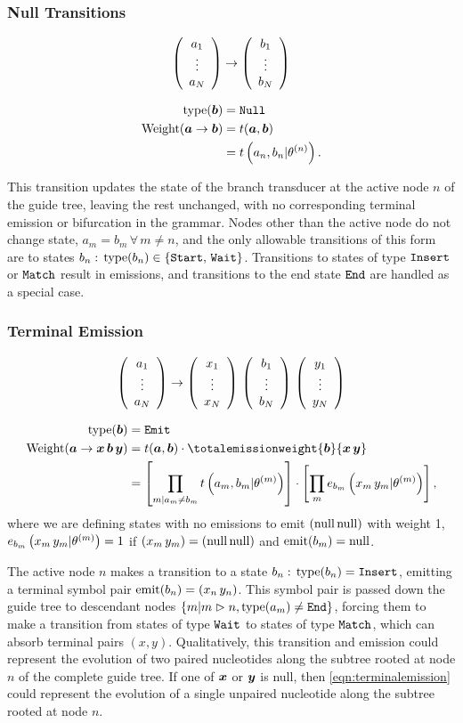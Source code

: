 \documentclass[10pt]{article}
\begin{document}
\subsubsection*{Null Transitions}

\[ \statevec{a} \to \statevec{b} \]

\begin{align} \label{eqn:nulltransition}
  \type(\bvec{b}) &= \Snull  \\
  \weight(\bvec{a}\to\bvec{b}) &= t(\bvec{a},\bvec{b}) \\
  &= \transweight{n}{a_n}{b_n} .
\end{align}

This transition updates the state of the branch transducer at the active node $n$ of the guide tree, leaving 
the rest unchanged, with no corresponding terminal emission or bifurcation in the grammar.
Nodes other than the active node do not change state, $a_m = b_m \,\forall\, m \ne n$, and the only 
allowable transitions of this form are to states $b_n:\,\type(b_n) \in \{\Sstart,\,\Swait\}$.  Transitions
to states of type $\Sinsert$ or $\Smatch$ result in emissions, and transitions to the end state $\Send$
are handled as a special case.


\subsubsection*{Terminal Emission} 
\[ \statevec{a} \to \statevec{x}\,\statevec{b}\,\statevec{y} \]

\begin{align} \label{eqn:terminalemission}
  \type(\bvec{b}) &= \Semit \\
  \weight(\bvec{a}\to\bvec{x}\,\bvec{b}\,\bvec{y}) &=  t(\bvec{a},\bvec{b}) \cdot \totalemissionweight{\bvec{b}}{\bvec{x}\,\bvec{y}} \\
  &= \left[ \prod_{m|a_m \ne b_m} \transweight{m}{a_m}{b_m} \right] \cdot \left[ \prod_m \emissionweight{m}{b_m}{x_m\,y_m} \right] ,
\end{align}
where we are defining states with no emissions to emit $(\Tnull\,\Tnull)$ with weight 1, 
$\emissionweight{m}{b_m}{x_m\,y_m} = 1$ if $(x_m\,y_m) = (\Tnull\,\Tnull)$ and $\emit(b_m) = \Tnull$.

The active node $n$ makes a transition to a state $b_n:\,\type(b_n) = \Sinsert$, emitting
a terminal symbol pair $\emit(b_n) = (x_n\,y_n)$.  This symbol pair is passed down the guide tree to descendant nodes $\{m|\mDn, \type(a_m) \ne \Send\}$, 
forcing them to make a transition from states of type $\Swait$ to states of type $\Smatch$, which can absorb
terminal pairs $(x,y)$.  Qualitatively, this transition and emission could represent the evolution
of two paired nucleotides along the subtree rooted at node $n$ of the complete guide tree.
If one of $\bvec{x}$ or $\bvec{y}$ is null, then \eqref{eqn:terminalemission} could represent the evolution of
a single unpaired nucleotide along the subtree rooted at node $n$.
\end{document}
